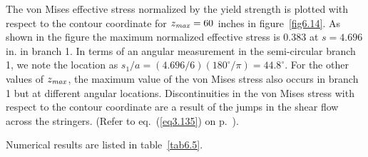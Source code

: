 \documentclass{AeroStructure-ERJohnson}
\begin{document}
\begin{example*}
The von Mises effective stress normalized by the yield strength is plotted with respect to the contour coordinate for $z_{\it max} = 60$ inches in figure~\ref{fig6.14}. As shown in the figure the maximum normalized effective stress is 0.383 at $s = 4.696$ in. in branch 1. In terms of an angular measurement in the semi-circular branch 1, we note the location as $s_{1} / a=(4.696 / 6)\left(180^{\circ} / \pi\right)=44.8^{\circ}$. For the other values of $z_{\it max}$, the maximum value of the von Mises stress also occurs in branch 1 but at different angular locations. Discontinuities in the von Mises stress with respect to the contour coordinate are a result of the jumps in the shear flow across the stringers. (Refer to eq.~(\ref{eq3.135}) on p.~\pageref{eq3.135}).


{\caption{Normalized von Mises effective stress plotted with respect to the contour\break coordinate s at the root cross section of the spar.}\label{fig6.14}}

Numerical results are listed in table~\ref{tab6.5}.
\vspace*{5pt}
\clearpage


\end{example*}
\end{document}
